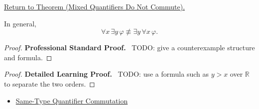 \newpage
{}
\label{prf:mixed-quantifiers-do-not-commute}

\begin{remark*}[Return]
\hyperref[thm:mixed-quantifiers-do-not-commute]{Return to Theorem (Mixed Quantifiers Do Not Commute).}
\end{remark*}

\begin{theorem*}
In general,
\[
\forall x\,\exists y\,\varphi \not\equiv \exists y\,\forall x\,\varphi.
\]
\end{theorem*}

\begin{proof}
\textbf{Professional Standard Proof.}~
TODO: give a counterexample structure and formula.
\end{proof}

\begin{proof}
\textbf{Detailed Learning Proof.}~
TODO: use a formula such as \(y>x\) over \(\mathbb R\) to separate the two
orders.
\end{proof}

\begin{remark*}
\end{remark*}

\begin{dependencies}
\begin{itemize}
  \item \hyperref[thm:qcomm]{Same-Type Quantifier Commutation}
\end{itemize}
\end{dependencies}

\clearpage
